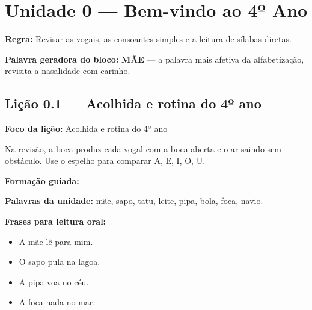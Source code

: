 

\chapter{Unidade 0 --- Bem-vindo ao 4º Ano}


\textbf{Regra:} Revisar as vogais, as consoantes simples e a leitura de sílabas diretas.

\textbf{Palavra geradora do bloco:} \textbf{MÃE} --- a palavra mais afetiva da alfabetização, revisita a nasalidade com carinho.

\section{Lição 0.1 --- Acolhida e rotina do 4º ano}

\textbf{Foco da lição:} Acolhida e rotina do 4º ano


\begin{boquinha}
Na revisão, a boca produz cada vogal com a boca aberta e o ar saindo sem obstáculo. Use o espelho para comparar A, E, I, O, U.
\end{boquinha}

\noindent\textbf{Formação guiada:}

\begin{center}
\end{center}

\noindent\textbf{Palavras da unidade:} mãe, sapo, tatu, leite, pipa, bola, foca, navio.

\noindent\textbf{Frases para leitura oral:}
\begin{itemize}[leftmargin=1.6em]
  \item A mãe lê para mim.
  \item O sapo pula na lagoa.
  \item A pipa voa no céu.
  \item A foca nada no mar.
\end{itemize}

